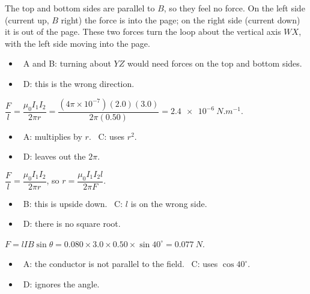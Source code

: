 \documentclass[12pt]{article}
\begin{document}
\begin{practiceanswers}
\begin{practiceans}
  The top and bottom sides are parallel to $B$, so they feel no force. On the left side (current up,
  $B$ right) the force is into the page; on the right side (current down) it is out of the page. These
  two forces turn the loop about the vertical axis $WX$, with the left side moving into the page.
  \begin{itemize}
    \item \xmark\ A and B: turning about $YZ$ would need forces on the top and bottom sides.
    \item \xmark\ D: this is the wrong direction.
  \end{itemize}
\end{practiceans}

\begin{practiceans}
  $\dfrac{F}{l} = \dfrac{\mu_0 I_1 I_2}{2\pi r} = \dfrac{(4\pi\times10^{-7})(2.0)(3.0)}{2\pi(0.50)}
  = \qty{2.4e-6}{N.m^{-1}}$.
  \begin{itemize}
    \item \xmark\ A: multiplies by $r$. \quad \xmark\ C: uses $r^2$.
    \item \xmark\ D: leaves out the $2\pi$.
  \end{itemize}
\end{practiceans}

\begin{practiceans}
  $\dfrac{F}{l} = \dfrac{\mu_0 I_1 I_2}{2\pi r}$, so $r = \dfrac{\mu_0 I_1 I_2 l}{2\pi F}$.
  \begin{itemize}
    \item \xmark\ B: this is upside down. \quad \xmark\ C: $l$ is on the wrong side.
    \item \xmark\ D: there is no square root.
  \end{itemize}
\end{practiceans}

\begin{practiceans}
  $F = lIB\sin\theta = 0.080 \times 3.0 \times 0.50 \times \sin 40^\circ = \qty{0.077}{N}$.
  \begin{itemize}
    \item \xmark\ A: the conductor is not parallel to the field. \quad \xmark\ C: uses $\cos 40^\circ$.
    \item \xmark\ D: ignores the angle.
  \end{itemize}
\end{practiceans}


\end{practiceanswers}
\end{document}
